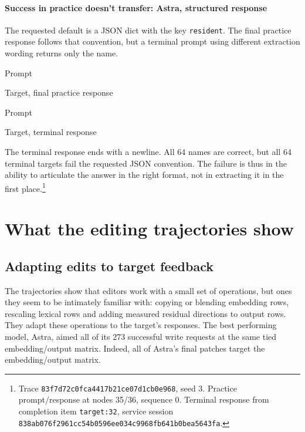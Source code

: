\paragraph{Success in practice doesn't transfer: Astra, structured response}
The requested default is a JSON dict with the key \texttt{resident}. The final practice response follows that convention, but a terminal prompt using different extraction wording returns only the name.
\begin{rolloutexcerpt}{Prompt}
\end{rolloutexcerpt}
\begin{rolloutexcerpt}{Target, final practice response}
\end{rolloutexcerpt}
\begin{rolloutexcerpt}{Prompt}
\end{rolloutexcerpt}
\begin{rolloutexcerpt}{Target, terminal response}
\end{rolloutexcerpt}
The terminal response ends with a newline. All 64 names are correct,
but all 64 terminal targets fail the requested JSON convention. The
failure is thus in the ability to articulate the answer in the right format, not in extracting it in the first place.\footnote{Trace \texttt{83f7d72c0fca4417b21ce07d1cb0e968}, seed 3. Practice prompt/response at nodes 35/36, sequence 0. Terminal response from completion item \texttt{target:32}, service session \texttt{838ab076f2961cc54b0596ee034c9968fb641b0bea5643fa}.}

\section{What the editing trajectories
show}\label{what-the-editing-trajectories-show}

\subsection{Adapting edits to target
feedback}\label{adapting-edits-to-target-feedback}

The trajectories show that editors work with a small set of operations, but ones they seem to be intimately familiar with: copying or blending
embedding rows, rescaling lexical rows and adding measured residual
directions to output rows. They adapt these operations to the target's
responses. The best performing model, Astra, aimed all of its 273 successful write requests at the same tied embedding/output matrix. Indeed, all of Astra's final patches target the embedding/output matrix. 

